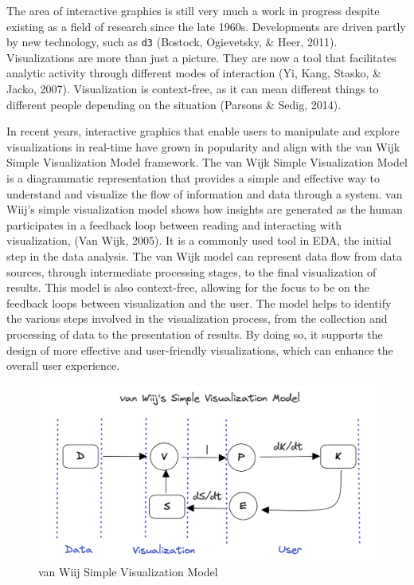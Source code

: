 \documentclass[print]{nuthesis}
\begin{document}
The area of interactive graphics is still very much a work in progress despite existing as a field of research since the late 1960s.
Developments are driven partly by new technology, such as \texttt{d3} (Bostock, Ogievetsky, \& Heer, 2011).
Visualizations are more than just a picture.
They are now a tool that facilitates analytic activity through different modes of interaction (Yi, Kang, Stasko, \& Jacko, 2007).
Visualization is context-free, as it can mean different things to different people depending on the situation (Parsons \& Sedig, 2014).

In recent years, interactive graphics that enable users to manipulate and explore visualizations in real-time have grown in popularity and align with the van Wijk Simple Visualization Model framework.
The van Wijk Simple Visualization Model is a diagrammatic representation that provides a simple and effective way to understand and visualize the flow of information and data through a system.
van Wiij's simple visualization model shows how insights are generated as the human participates in a feedback loop between reading and interacting with visualization, (Van Wijk, 2005).
It is a commonly used tool in EDA, the initial step in the data analysis.
The van Wijk model can represent data flow from data sources, through intermediate processing stages, to the final visualization of results.
This model is also context-free, allowing for the focus to be on the feedback loops between visualization and the user.
The model helps to identify the various steps involved in the visualization process, from the collection and processing of data to the presentation of results.
By doing so, it supports the design of more effective and user-friendly visualizations, which can enhance the overall user experience.

\begin{figure}

{\centering \includegraphics[width=0.45\linewidth]{figure/vanWiijSimpleModel} 

}

\caption{van Wiij Simple Visualization Model}\label{fig:vanWiijmodel}
\end{figure}
\end{document}
